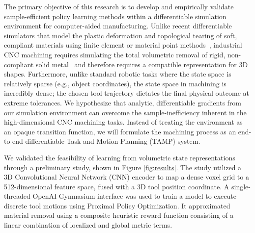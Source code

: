 \documentclass[11pt, letterpaper]{article}
\begin{document}
The primary objective of this research is to develop and empirically validate sample-efficient policy learning methods within a differentiable simulation environment for computer-aided manufacturing.
Unlike recent differentiable simulators that model the plastic deformation and topological tearing of soft, compliant materials using finite element or material point methods~\cite{xu2023roboninja,heiden2021disect,wang2025autonomous}, industrial CNC machining requires simulating the total volumetric removal of rigid, non-compliant solid metal~\cite{zhou2025spatially} and therefore requires a compatible representation for 3D shapes.
Furthermore, unlike standard robotic tasks where the state space is relatively sparse (e.g., object coordinates), the state space in machining is incredibly dense; the chosen tool trajectory dictates the final physical outcome at extreme tolerances.
We hypothesize that analytic, differentiable gradients from our simulation environment can overcome the sample-inefficiency inherent in the high-dimensional CNC machining tasks.
Instead of treating the environment as an opaque transition function, we will formulate the machining process as an end-to-end differentiable Task and Motion Planning (TAMP) system.

We validated the feasibility of learning from volumetric state representations through a preliminary study, shown in Figure \ref{fig:results}.
The study utilized a 3D Convolutional Neural Network (CNN) encoder to map a dense voxel grid to a 512-dimensional feature space, fused with a 3D tool position coordinate.
A single-threaded OpenAI Gymnasium interface was used to train a model to execute discrete tool motions using Proximal Policy Optimization.
It approximated material removal using a composite heuristic reward function consisting of a linear combination of localized and global metric terms.

\end{document}
